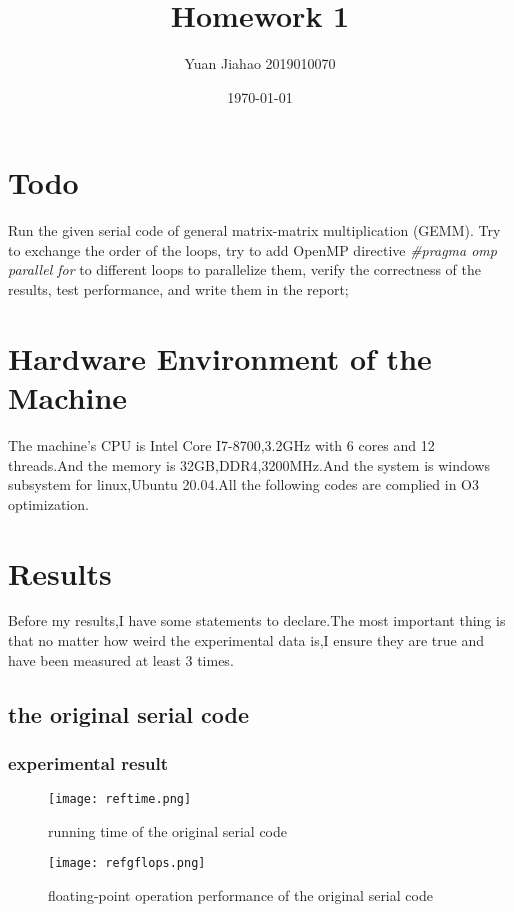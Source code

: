 \documentclass[11pt]{scrartcl} %
\title{	
	Homework 1
}
\author{Yuan Jiahao 2019010070} %
\date{\normalsize\today} %
\begin{document}
\maketitle %


\section{Todo}
Run the given serial code of general matrix-matrix multiplication (GEMM). Try to
exchange the order of the loops, try to add OpenMP directive \textit{\#pragma omp parallel for} to
different loops to parallelize them, verify the correctness of the results, test performance, and
write them in the report;
\section{Hardware Environment of the Machine }
The machine's CPU is Intel Core I7-8700,3.2GHz with 6 cores and 12 threads.And the memory is 32GB,DDR4,3200MHz.And the system is windows subsystem for linux,Ubuntu 20.04.All the following codes are complied in O3 optimization.
\section{Results}
Before my results,I have some statements to declare.The most important thing is that no matter how weird the experimental data is,I ensure they are true and have been measured at least 3 times.\label{abcc}
\subsection{the original serial code}
	\subsubsection{experimental result}
		\begin{figure}[H]
			\centering
			\texttt{[image: reftime.png]}
			\caption{running time of the original serial code}
			\label{}
		\end{figure}
		\begin{figure}[H]
			\centering
			\texttt{[image: refgflops.png]}
			\caption{floating-point operation performance of the original serial code}
			\label{daf}
		\end{figure}
\end{document}
